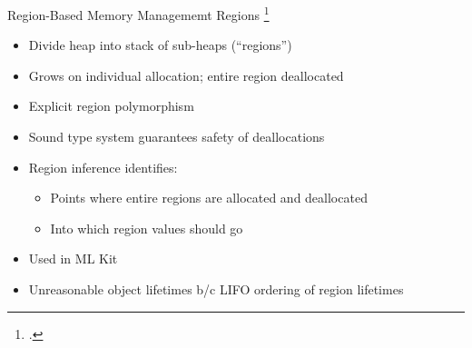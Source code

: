 \documentclass[aspectratio=169]{beamer}
\begin{document}

\begin{frame}{Region-Based Memory Managememt}
    Regions \footcite{tofte_region-based_1997}
    \begin{itemize}[<+->]
        \item Divide heap into stack of sub-heaps (``regions'') 
        \item Grows on individual allocation; \alert{entire} region deallocated 
        \item Explicit region polymorphism 
        \item Sound type system \alert{guarantees safety} of deallocations 
        \item Region inference identifies:
            \begin{itemize}
                \item Points where entire regions are allocated and deallocated
                \item Into which region values should go
            \end{itemize}
        \item Used in ML Kit
        \item Unreasonable object lifetimes b/c LIFO ordering of region lifetimes %
    \end{itemize}
    \vspace{0.1in}
\end{frame}
\end{document}
